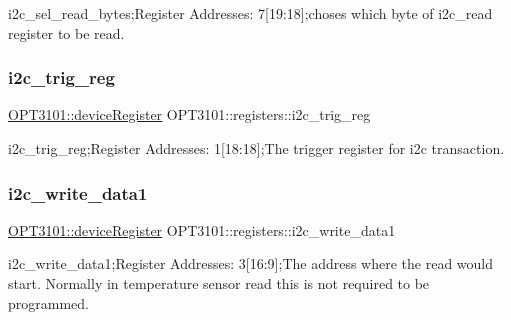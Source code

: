i2c\+\_\+sel\+\_\+read\+\_\+bytes;Register Addresses\+: 7\mbox{[}19\+:18\mbox{]};choses which byte of i2c\+\_\+read register to be read. 

\mbox{\label{class_o_p_t3101_1_1registers_a45c7b0357126b98470aac2dd8d577ddb}} 
\subsubsection{\texorpdfstring{i2c\+\_\+trig\+\_\+reg}{i2c\_trig\_reg}}
{\footnotesize\ttfamily \mbox{\hyperlink{class_o_p_t3101_1_1device_register}{O\+P\+T3101\+::device\+Register}} O\+P\+T3101\+::registers\+::i2c\+\_\+trig\+\_\+reg}



i2c\+\_\+trig\+\_\+reg;Register Addresses\+: 1\mbox{[}18\+:18\mbox{]};The trigger register for i2c transaction. 

\mbox{\label{class_o_p_t3101_1_1registers_adf24c56655b70ac41364ab30f75dc61c}} 
\subsubsection{\texorpdfstring{i2c\+\_\+write\+\_\+data1}{i2c\_write\_data1}}
{\footnotesize\ttfamily \mbox{\hyperlink{class_o_p_t3101_1_1device_register}{O\+P\+T3101\+::device\+Register}} O\+P\+T3101\+::registers\+::i2c\+\_\+write\+\_\+data1}



i2c\+\_\+write\+\_\+data1;Register Addresses\+: 3\mbox{[}16\+:9\mbox{]};The address where the read would start. Normally in temperature sensor read this is not required to be programmed. 

\mbox{\label{class_o_p_t3101_1_1registers_a7405a3e25e7f825958b7d271cb183d56}} 
